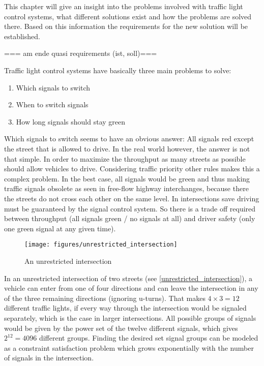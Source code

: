 This chapter will give an insight into the problems involved with traffic light control systems, what different solutions exist and how the problems are solved there. Based on this information the requirements for the new solution will be established.

=== am ende quasi requirements (ist, soll)===

Traffic light control systems have basically three main problems to solve:

\begin{enumerate}
	\item Which signals to switch
	\item When to switch signals
	\item How long signals should stay green
\end{enumerate}

Which signals to switch seems to have an obvious answer: All signals red except the street that is allowed to drive. In the real world however, the answer is not that simple. In order to maximize the throughput as many streets as possible should allow vehicles to drive. Considering traffic priority other rules makes this a complex problem. In the best case, all signals would be green and thus making traffic signals obsolete as seen in free-flow highway interchanges, because there the streets do not cross each other on the same level. In intersections save driving must be guaranteed by the signal control system. So there is a trade off required between throughput (all signals green / no signals at all) and driver safety (only one green signal at any given time).

\begin{figure}[ht]
	\centering
	\texttt{[image: figures/unrestricted\_intersection]}
	\caption{An unrestricted intersection}
	\label{unrestricted_intersection}
\end{figure}

In an unrestricted intersection of two streets (see \autoref{unrestricted_intersection}), a vehicle can enter from one of four directions and can leave the intersection in any of the three remaining directions (ignoring u-turns). That makes $4 \times 3 = 12$ different traffic lights, if every way through the intersection would be signaled separately, which is the case in larger intersections. All possible groups of signals would be given by the power set of the twelve different signals, which gives $2^{12} = 4096$ different groups. Finding the desired set signal groups can be modeled as a constraint satisfaction problem which grows exponentially with the number of signals in the intersection.

